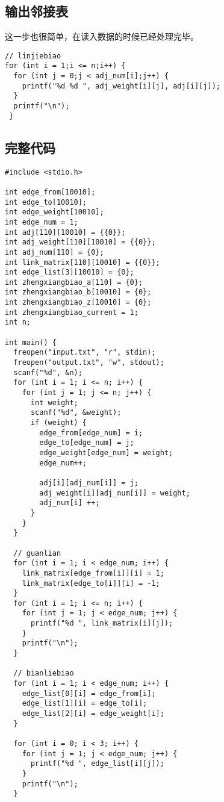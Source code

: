 \documentclass[11pt]{article}
\begin{document}
\subsection{输出邻接表}
\label{sec:orgc4b3c87}
这一步也很简单，在读入数据的时候已经处理完毕。

\begin{verbatim}
// linjiebiao
for (int i = 1;i <= n;i++) {
  for (int j = 0;j < adj_num[i];j++) {
    printf("%d %d ", adj_weight[i][j], adj[i][j]);
  }
  printf("\n");
 }
\end{verbatim}

\subsection{完整代码}
\label{sec:org6ca54fa}
\begin{verbatim}
#include <stdio.h>

int edge_from[10010];
int edge_to[10010];
int edge_weight[10010];
int edge_num = 1;
int adj[110][10010] = {{0}};
int adj_weight[110][10010] = {{0}};
int adj_num[110] = {0};
int link_matrix[110][10010] = {{0}};
int edge_list[3][10010] = {0};
int zhengxiangbiao_a[110] = {0};
int zhengxiangbiao_b[10010] = {0};
int zhengxiangbiao_z[10010] = {0};
int zhengxiangbiao_current = 1;
int n;

int main() {
  freopen("input.txt", "r", stdin);
  freopen("output.txt", "w", stdout);
  scanf("%d", &n);
  for (int i = 1; i <= n; i++) {
    for (int j = 1; j <= n; j++) {
      int weight;
      scanf("%d", &weight);
      if (weight) {
        edge_from[edge_num] = i;
        edge_to[edge_num] = j;
        edge_weight[edge_num] = weight;
        edge_num++;

        adj[i][adj_num[i]] = j;
        adj_weight[i][adj_num[i]] = weight;
        adj_num[i] ++;
      }
    }
  }

  // guanlian
  for (int i = 1; i < edge_num; i++) {
    link_matrix[edge_from[i]][i] = 1;
    link_matrix[edge_to[i]][i] = -1;
  }
  for (int i = 1; i <= n; i++) {
    for (int j = 1; j < edge_num; j++) {
      printf("%d ", link_matrix[i][j]);
    }
    printf("\n");
  }

  // bianliebiao
  for (int i = 1; i < edge_num; i++) {
    edge_list[0][i] = edge_from[i];
    edge_list[1][i] = edge_to[i];
    edge_list[2][i] = edge_weight[i];
  }

  for (int i = 0; i < 3; i++) {
    for (int j = 1; j < edge_num; j++) {
      printf("%d ", edge_list[i][j]);
    }
    printf("\n");
  }


\end{verbatim}
\end{document}

